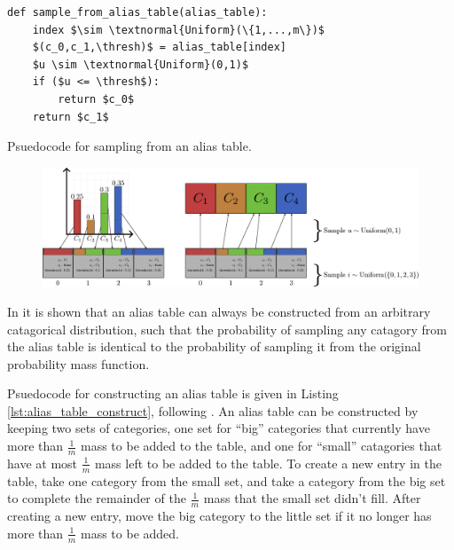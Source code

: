     \begin{Listing}
        \begin{lstlisting}
def sample_from_alias_table(alias_table):
    index $\sim \textnormal{Uniform}(\{1,...,m\})$
    $(c_0,c_1,\thresh)$ = alias_table[index]
    $u \sim \textnormal{Uniform}(0,1)$
    if ($u <= \thresh$):
        return $c_0$ 
    return $c_1$
        \end{lstlisting}
        \caption{Psuedocode for sampling from an alias table.}
        \label{lst:alias_table_sample}
    \end{Listing}

        
    \begin{figure}
        \centering\includegraphics[width=1.0\textwidth]{figures/ch2/alias_table.pdf} 
        \caption{ }
        \label{fig:alias_table_eg} 
    \end{figure}

    In  it is shown  that an alias table can always be constructed from an arbitrary catagorical distribution, such that the probability of sampling any catagory from the alias table is identical to the probability of sampling it from the original probability mass function. 

    Psuedocode for constructing an alias table is given in Listing \ref{lst:alias_table_construct}, following . An alias table can be constructed by keeping two sets of categories, one set for ``big'' categories that currently have more than $\frac{1}{m}$ mass to be added to the table, and one for ``small'' catagories that have at most $\frac{1}{m}$ mass left to be added to the table. To create a new entry in the table, take one category from the small set, and take a category from the big set to complete the remainder of the $\frac{1}{m}$ mass that the small set didn't fill. After creating a new entry, move the big category to the little set if it no longer has more than $\frac{1}{m}$ mass to be added. 

